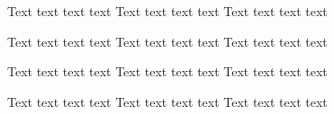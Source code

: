 \documentclass[11pt,a4paper]{book}
\begin{document}
\begin{pages}
\begin{Leftside}
\beginnumbering
\pstart{}\pend

\numberpstarttrue
\pstart Text text text text\pend
\pstart Text text text text\pend
\pstart Text text text text\pend

\numberpstartfalse
\pstart{}\pend

\numberpstarttrue
\setcounter{pstartL}{1}
\pstart Text text text text\pend
\pstart Text text text text\pend
\pstart Text text text text\pend
\endnumbering
\end{Leftside}

\begin{Rightside}
\beginnumbering
\pstart{}\pend

\numberpstarttrue
\pstart Text text text text\pend
\pstart Text text text text\pend
\pstart Text text text text\pend

\numberpstartfalse
\pstart{}\pend

\numberpstarttrue
\setcounter{pstartR}{1}
\pstart Text text text text\pend
\pstart Text text text text\pend
\pstart Text text text text\pend
\endnumbering
\end{Rightside}
\end{pages}
\Pages
\end{document}
